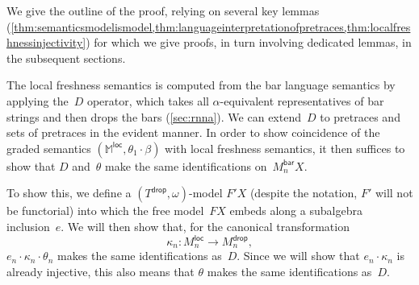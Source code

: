 \documentclass[11pt,a4paper]{amsart}
\newcommand{\Br}{\mathsf{bar}}
\newcommand{\loc}{\mathsf{loc}}
\newcommand{\drop}{\mathsf{drop}}
\theoremstyle{plain}
\numberwithin{equation}{section}
\newcommand{\monad}{{\mathbb{M}}}
\newcommand{\+}[1]{\mathcal{#1}\xspace}
\theoremstyle{definition}
\begin{document}
We give the outline of the proof, relying on several key lemmas
(\cref{thm:semanticsmodelismodel,thm:languageinterpretationofpretraces,thm:localfreshnessinjectivity})
for which we give proofs, in turn involving dedicated lemmas, in the
subsequent sections.

The local freshness semantics is computed from the bar language
semantics by applying the~$D$ operator, which takes all
$\alpha$-equivalent representatives of bar strings and then drops the
bars (\cref{sec:rnna}). We can extend~$D$ to pretraces and sets of
pretraces in the evident manner. In order to show coincidence of the
graded semantics $(\monad^\loc,\theta_1\cdot\beta)$ with local
freshness semantics, it then suffices to show that $D$ and~$\theta$
make the same identifications on~$M_n^\Br X$.

To show this, we define a $(T^\drop, \omega)$-model $F'X$ (despite the notation, $F'$ will not be functorial) into which the free model~$FX$ embeds along a subalgebra inclusion~$e$.
We will then show that, for the canonical transformation
\begin{equation*}
  \kappa_n\colon M_n^\loc \to M_n^\drop,
\end{equation*}
$e_n \cdot \kappa_n \cdot \theta_n$ makes the same identifications as~$D$. %
Since we will show that $e_n \cdot \kappa_n$ is already injective, this also means that $\theta$ makes the same identifications as~$D$.
\end{document}
